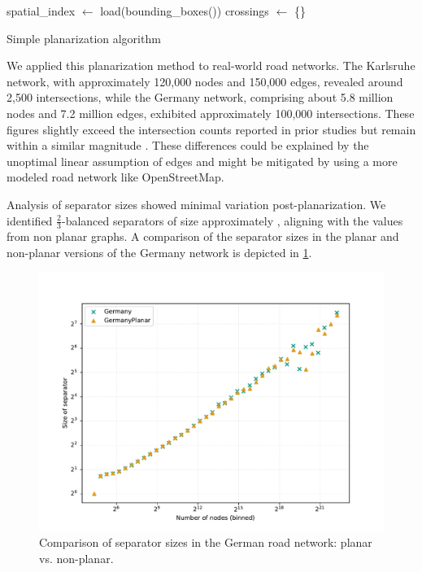 \begin{algorithm}[b]
	\BlankLine
	spatial\_index \(\longleftarrow\) load(bounding\_boxes(\E))\;
	crossings \(\longleftarrow\) \{\}\;
	\caption{Simple planarization algorithm \label{alg:planarization}}
\end{algorithm}

We applied this planarization method to real-world road networks. The Karlsruhe
network, with approximately 120,000 nodes and 150,000 edges, revealed around
2,500 intersections, while the Germany network, comprising about 5.8 million
nodes and 7.2 million edges, exhibited approximately 100,000 intersections.
These figures slightly exceed the  intersection counts reported
in prior studies but remain within a similar magnitude
\cite{eppstein_linear-time_2010}. These differences could be explained by the
unoptimal linear assumption of edges and might be mitigated by using a more
modeled road network like OpenStreetMap.

Analysis of separator sizes showed minimal variation post-planarization. We
identified \(\frac{2}{3}\)-balanced separators of size approximately
, aligning with the values from non planar graphs. A comparison of
the separator sizes in the planar and non-planar versions of the Germany
network is depicted in \cref{fig:germany_planar_vs_non_planar}.

\begin{figure}
	\centering
	\includegraphics[width=0.8\linewidth]{graphics/GermanyPlanarVsNonPlanar.pdf}
	\caption{Comparison of separator sizes in the German road network: planar vs. non-planar.}
	\label{fig:germany_planar_vs_non_planar}
\end{figure}

